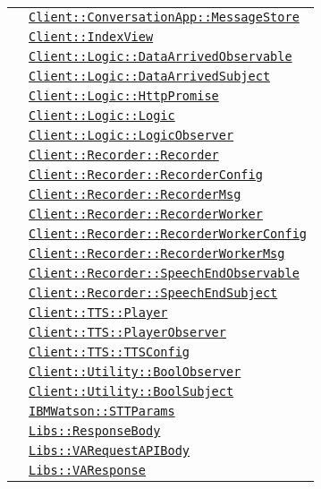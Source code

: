 \begin{longtable}{|>{\centering}m{3cm}|m{10cm}<{\centering}|}
& \hyperref[Client::ConversationApp::MessageStore]{\texttt{Client::ConversationApp::MessageStore}}\\
& \hyperref[Client::IndexView]{\texttt{Client::IndexView}}\\
& \hyperref[Client::Logic::DataArrivedObservable]{\texttt{Client::Logic::DataArrivedObservable}}\\
& \hyperref[Client::Logic::DataArrivedSubject]{\texttt{Client::Logic::DataArrivedSubject}}\\
& \hyperref[Client::Logic::HttpPromise]{\texttt{Client::Logic::HttpPromise}}\\
& \hyperref[Client::Logic::Logic]{\texttt{Client::Logic::Logic}}\\
& \hyperref[Client::Logic::LogicObserver]{\texttt{Client::Logic::LogicObserver}}\\
& \hyperref[Client::Recorder::Recorder]{\texttt{Client::Recorder::Recorder}}\\
& \hyperref[Client::Recorder::RecorderConfig]{\texttt{Client::Recorder::RecorderConfig}}\\
& \hyperref[Client::Recorder::RecorderMsg]{\texttt{Client::Recorder::RecorderMsg}}\\
& \hyperref[Client::Recorder::RecorderWorker]{\texttt{Client::Recorder::RecorderWorker}}\\
& \hyperref[Client::Recorder::RecorderWorkerConfig]{\texttt{Client::Recorder::RecorderWorkerConfig}}\\
& \hyperref[Client::Recorder::RecorderWorkerMsg]{\texttt{Client::Recorder::RecorderWorkerMsg}}\\
& \hyperref[Client::Recorder::SpeechEndObservable]{\texttt{Client::Recorder::SpeechEndObservable}}\\
& \hyperref[Client::Recorder::SpeechEndSubject]{\texttt{Client::Recorder::SpeechEndSubject}}\\
& \hyperref[Client::TTS::Player]{\texttt{Client::TTS::Player}}\\
& \hyperref[Client::TTS::PlayerObserver]{\texttt{Client::TTS::PlayerObserver}}\\
& \hyperref[Client::TTS::TTSConfig]{\texttt{Client::TTS::TTSConfig}}\\
& \hyperref[Client::Utility::BoolObserver]{\texttt{Client::Utility::BoolObserver}}\\
& \hyperref[Client::Utility::BoolSubject]{\texttt{Client::Utility::BoolSubject}}\\
& \hyperref[IBMWatson::STTParams]{\texttt{IBMWatson::STTParams}}\\
& \hyperref[Libs::ResponseBody]{\texttt{Libs::ResponseBody}}\\
& \hyperref[Libs::VARequestAPIBody]{\texttt{Libs::VARequestAPIBody}}\\
& \hyperref[Libs::VAResponse]{\texttt{Libs::VAResponse}}\\ \hline


\end{longtable}
